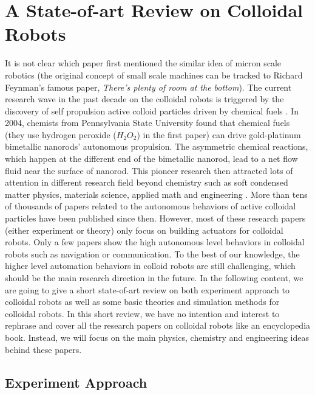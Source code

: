 \section{A State-of-art Review on Colloidal Robots }
It is not clear which paper first mentioned the similar idea of micron scale robotics (the original concept of  small scale machines can be tracked to Richard Feynman's famous paper, \textit{There's plenty of room at the bottom}\autocite{feynman1960there}). The current research wave in the past decade on the colloidal robots is triggered by the discovery of self propulsion active colloid particles driven by chemical fuels \autocite{paxton2004catalytic}. In 2004, chemists from Pennsylvania State University found that chemical fuels (they use hydrogen peroxide ($H_2O_2$) in the first paper) can drive  gold-platinum bimetallic nanorods' autonomous propulsion. The asymmetric chemical reactions, which happen at the different end of the bimetallic nanorod,  lead to a net flow fluid near the surface of nanorod. This pioneer research then attracted lots of attention in different research field beyond chemistry such as soft condensed matter physics\autocite{Marchetti2013}, materials science\autocite{han2018engineering}, applied math\autocite{fodor2016far} and engineering \autocite{sitti2015biomedical}. More than tens of thousands of papers related to the autonomous behaviors of active colloidal particles have been published since then. However, most of these research papers (either experiment or theory) only focus on building actuators for colloidal robots. Only a few papers show the high autonomous level behaviors in colloidal robots such as navigation or communication. To the best of our knowledge, the higher level automation behaviors in colloid robots are still challenging, which should be the main research direction in the future. In the following content, we are going to give a short state-of-art review on both experiment approach to colloidal robots as well as some basic theories and simulation methods for colloidal robots. In this short review, we have no intention and interest to rephrase and cover all the research papers on colloidal robots like an encyclopedia book. Instead,  we will focus on the main physics, chemistry and engineering ideas behind these papers. 

\subsection{Experiment Approach}

